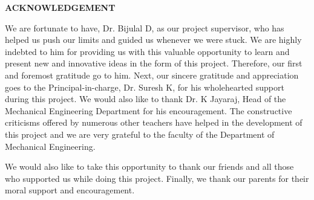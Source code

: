
\parbox[1in]{4in}{}

\begin{center}
\textbf{\Large ACKNOWLEDGEMENT}
\end{center}

\vspace{1cm}


We are fortunate to have, Dr. Bijulal D, as our project supervisor, who has helped us push our limits and guided us whenever we were stuck. We are highly indebted to him for providing us with this valuable opportunity to learn and present new and innovative ideas in the form of this project. Therefore, our first and foremost gratitude go to him. Next, our sincere gratitude and appreciation goes to the Principal-in-charge, Dr. Suresh K, for his wholehearted support during this project. We would also like to thank Dr. K Jayaraj, Head of the Mechanical Engineering Department for his encouragement. The constructive criticisms offered by numerous other teachers have helped in the development of this project and we are very grateful to the faculty of the Department of Mechanical Engineering.

We would also like to take this opportunity to thank our friends and all those who supported us while doing this project. Finally, we thank our parents for their moral support and encouragement.



 




\vspace{1.5cm}
\begin{flushright}
	{\stone}\\{{\sttwo}}\\{{\stthree}}\\{{\stfour}}
\end{flushright}